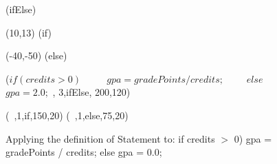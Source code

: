 




\begin {figure}

\Draw

\MarkLoc(ifElse)

\Move(10,13)
\MarkLoc(if)

\Move(-40,-50)
\MarkLoc(else)




\boxIt ($if (credits > 0)$ \hfill	~~~~
       \hspace{10pt} $gpa = gradePoints / credits;$\hfill ~~~~
       $else$\hfill			~~~~
       \hspace{10pt} $gpa = 2.0;$ \hfill, 3,ifElse, 200,120)

\boxIt (~,1,if,150,20)
\boxIt (~,1,else,75,20)

\EndDraw


\caption {Applying the definition of 
 Statement to: 	
if credits $>$ 0) gpa = gradePoints / credits;
else gpa = 0.0;
}
 \label {fig:ifElseStmt}

\end {figure}


